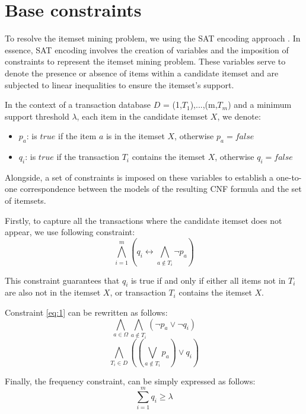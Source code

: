 \section{Base constraints}
To resolve the itemset mining problem, we using the SAT encoding approach \cite{ism_satapproach}.
In essence, SAT encoding involves the creation of variables and the imposition of constraints to represent the itemset mining problem.
These variables serve to denote the presence or absence of items within a candidate itemset and are subjected to linear inequalities to ensure the itemset's support.

In the context of a transaction database $D$ = {(1,$T_1$),...,(m,$T_m$)} and a minimum support threshold $\lambda$,
each item in the candidate itemset $X$, we denote:
\begin{itemize}
    \item $p_a$: is $true$ if the item $a$ is in the itemset $X$, otherwise $p_a = false$
    \item $q_i$: is $true$ if the transaction $T_i$ contains the itemset $X$, otherwise $q_i = false$
\end{itemize}
Alongside, a set of constraints is imposed on these variables to establish a one-to-one correspondence between the models of the resulting CNF formula and the set of itemsets.

Firstly, to capture all the transactions where the candidate itemset does not appear, we use following constraint:
\begin{equation}
    \label{eq:1}
    \bigwedge_{i=1}^{m} (q_i \leftrightarrow \bigwedge_{a \notin T_i} \neg p_a)
\end{equation}

This constraint guarantees that $q_i$ is true if and only if either all items not in $T_i$ are also not in the itemset $X$, or transaction $T_i$ contains the itemset $X$.

Constraint \ref{eq:1} can be rewritten as follows:
\begin{equation}
    \label{eq:2}
    \bigwedge_{a \in \Omega} \bigwedge_{a \notin T_i} (\neg p_a \vee \neg q_i)
\end{equation}
\begin{equation}
    \label{eq:3}
    \bigwedge_{T_i \in D} ((\bigvee_{a \notin T_i} p_a) \vee q_i)
\end{equation}


Finally, the frequency constraint, can be simply expressed as follows:
\begin{equation}
    \label{eq:4}
    \sum_{i=1}^{m} q_i \geq \lambda
\end{equation}

